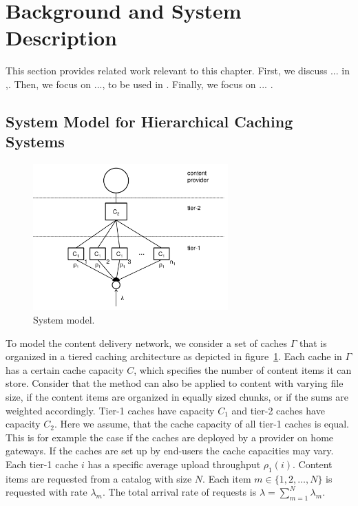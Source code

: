 \section{Background and System Description}\label{sec:cloud:related_work}
This section provides related work relevant to this chapter.
First, we discuss ... in ,.
Then, we focus on ..., to be used in .
Finally, we focus on ... .

\subsection{System Model for Hierarchical Caching Systems}

\begin{figure}[tb]
\centering
\includegraphics[width=75mm]{hierarchical/analyticbw/figures/hcmodel}
\caption{System model.}
\label{fig:hcmodel}
\end{figure}

To model the content delivery network, we consider a set of caches $\Gamma$ that is organized in a tiered caching architecture as depicted in figure~\ref{fig:hcmodel}. Each cache in $\Gamma$ has a certain cache capacity $C$, which specifies the number of content items it can store.
Consider that the method can also be applied to content with varying file size, if the content items are organized in equally sized chunks, or if the sums are weighted accordingly.
Tier-1 caches have capacity $C_1$ and tier-2 caches have capacity $C_2$.
Here we assume, that the cache capacity of all tier-1 caches is equal.
This is for example the case if the caches are deployed by a provider on home gateways.
If the caches are set up by end-users the cache capacities may vary.
Each tier-1 cache $i$ has a specific average upload throughput $\rho_1(i)$.
Content items are requested from a catalog with size $N$.
Each item $m\in \{1,2,\dots,N\}$ is requested with rate $\lambda_m$.
The total arrival rate of requests is $\lambda=\sum_{m=1}^N \lambda_m$.


